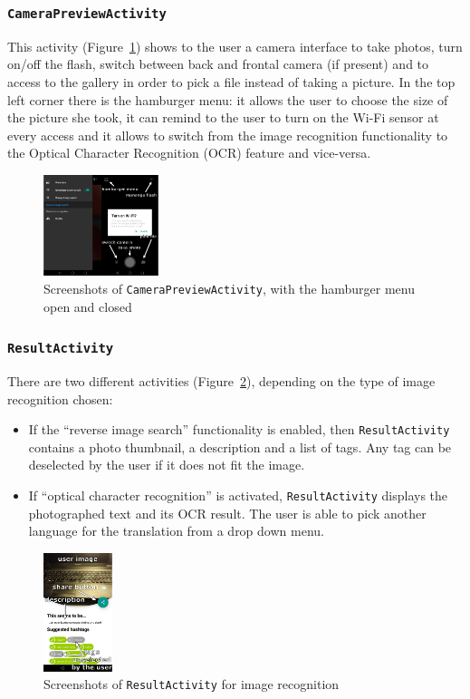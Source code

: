 \subsubsection{\texttt{CameraPreviewActivity}}
This activity (Figure~\ref{fig:mainActivity}) shows to the user a camera
interface  to take photos, turn on/off the flash, switch between back and
frontal camera (if present) and to access to the gallery in order to pick a file
instead of taking a picture. In the top left corner there is the hamburger
menu: it allows the user to choose the size of the picture she took, it can remind 
to the user to turn on the Wi-Fi sensor at every access and it allows to switch 
from the image recognition functionality to the Optical Character Recognition (OCR)
feature and vice-versa.
\begin{figure}[h]
    \centering
    \includegraphics[width=0.30\textwidth]{../img/main_activity}
    \caption{Screenshots of \texttt{CameraPreviewActivity}, with the hamburger
menu open and closed}
    \label{fig:mainActivity}
\end{figure}

\subsubsection{\texttt{ResultActivity}}
There are two different activities (Figure~\ref{fig:imageResultActivity}),
depending on the type of image recognition chosen:
\begin{itemize}
        \item If the ``reverse image search'' functionality is enabled, then
\texttt{ResultActivity} contains a photo thumbnail, a description and a list of
tags. Any tag can be deselected by the user if it does not fit the image.
    \item If ``optical character recognition'' is activated,
\texttt{ResultActivity} displays the photographed text and its OCR result.
The user is able to pick another language for the translation from a drop down menu.
\end{itemize}

\begin{figure}[h]
    \centering
    \includegraphics[width=0.18\textwidth]{../img/image_result_activity}
    \caption{Screenshots of \texttt{ResultActivity} for image recognition}
    \label{fig:imageResultActivity}
\end{figure}

